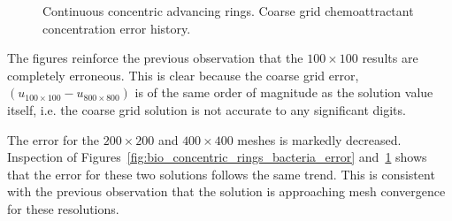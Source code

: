 \begin{figure}
\begin{center}
    \caption{Continuous concentric advancing rings. Coarse grid chemoattractant concentration error history.\label{fig:bio_concentric_rings_chemoattractant_error}}
  \end{center}
\end{figure}

The figures reinforce the previous observation that the $100\times 100$ results are completely erroneous.  This is clear because the coarse grid error, $(u_{100\times 100} - u_{800\times 800})$ is of the same order of magnitude as the solution value itself, i.e. the coarse grid solution is not accurate to any significant digits.

The error for the $200\times 200$ and $400\times 400$ meshes is markedly decreased.  Inspection of Figures~\ref{fig:bio_concentric_rings_bacteria_error} and~\ref{fig:bio_concentric_rings_chemoattractant_error} shows that the error for these two solutions follows the same trend.  This is consistent with the previous observation that the solution is approaching mesh convergence for these resolutions. 

